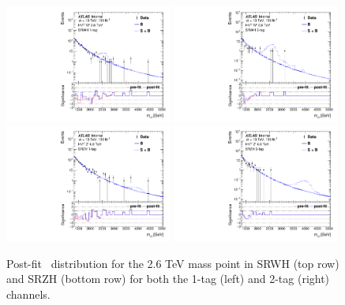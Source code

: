 \begin{figure}[htbp!]
    \begin{center}
        \includegraphics[width=0.49\textwidth]{VHqqbbPrePostFit_Chqqbb_SRWH_1tag_mVH_2600.pdf}
        \includegraphics[width=0.49\textwidth]{VHqqbbPrePostFit_Chqqbb_SRWH_2tag_mVH_2600.pdf} \\
        \includegraphics[width=0.49\textwidth]{VHqqbbPrePostFit_Chqqbb_SRZH_1tag_mVH_4000.pdf}
        \includegraphics[width=0.49\textwidth]{VHqqbbPrePostFit_Chqqbb_SRZH_2tag_mVH_4000.pdf}
    \end{center}
    \caption{Post-fit \mvh\ distribution for the 2.6 TeV mass point in SRWH (top row) and SRZH (bottom row) for both the 1-tag (left) and 2-tag (right) channels.}
    \label{fig:post_fit_2p6TeV}
\end{figure}

